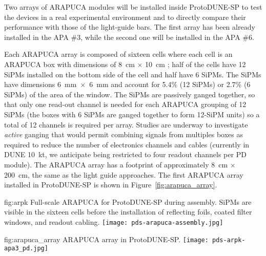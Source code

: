 Two arrays of ARAPUCA modules will be installed inside ProtoDUNE-SP to test the devices in a real experimental environment and to directly compare their performance with those of the light-guide bars. The first array has been already installed in the APA \#3, while the second one will be installed in the APA \#6.
 
Each ARAPUCA array is composed of sixteen cells where each cell is an ARAPUCA box with dimensions of \SI{8}{cm} $\times$ \SI{10}{cm} ; half of the cells have \num{12} SiPMs installed on the bottom side of the cell and  half have \num{6} SiPMs. The SiPMs have dimensions \SI{6}{mm}~$\times$~\SI{6}{mm} and account for 5.4\% (\num{12} SiPMs) or 2.7\% (\num{6} SiPMs) of the area of the window.
The SiPMs  are passively ganged together, so that only one read-out channel is needed for each ARAPUCA grouping of \num{12} SiPMs (the boxes with \num{6} SiPMs are ganged together to form 12-SiPM units) so a total of \num{12} channels is required per array. Studies are underway to investigate {\it active} ganging that would permit combining signals from multiples boxes as required to reduce the number of electronics channels and cables (currently in DUNE 10~kt, we anticipate being restricted to four readout channels per PD module). 
The ARAPUCA array has a footprint of approximately \SI{8}{cm} $\times$ \SI{200}{cm}, the same as the light guide approaches. 
The first ARAPUCA array installed in ProtoDUNE-SP is shown in Figure~\ref{fig:arapuca_array}.


\begin{dunefigure}{fig:arpk}
{Full-scale ARAPUCA for ProtoDUNE-SP during assembly. SiPMs are visible in the sixteen cells before the installation of reflecting foils, coated filter windows, and readout cabling. } 
\texttt{[image: pds-arapuca-assembly.jpg]}
\end{dunefigure}

\begin{dunefigure}{fig:arapuca_array}
{ARAPUCA array in ProtoDUNE-SP.} 	
\texttt{[image: pds-arpk-apa3\_pd.jpg]} 
\end{dunefigure}


